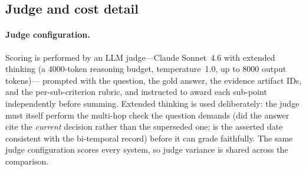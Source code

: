 %

\subsection{Judge and cost detail}
\label{app:extended:judge-cost}

\paragraph{Judge configuration.}
Scoring is performed by an LLM judge---Claude Sonnet~4.6 with extended thinking
(a 4000-token reasoning budget, temperature~1.0, up to 8000 output tokens)---
prompted with the question, the gold answer, the evidence artifact IDs, and the
per-sub-criterion rubric, and instructed to award each sub-point independently
before summing. Extended thinking is used deliberately: the judge must itself
perform the multi-hop check the question demands (did the answer cite the
\emph{current} decision rather than the superseded one; is the asserted date
consistent with the bi-temporal record) before it can grade faithfully. The same
judge configuration scores every system, so judge variance is shared across the
comparison.

